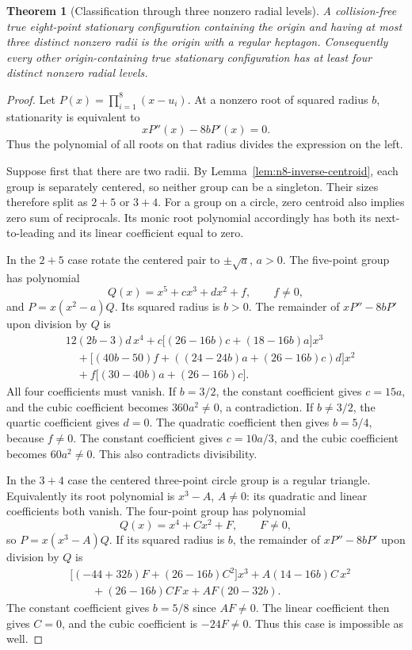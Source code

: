 \documentclass[11pt]{article}
\newtheorem{theorem}{Theorem}[section]
\theoremstyle{remark}
\numberwithin{equation}{section}
\begin{document}
\begin{theorem}[Classification through three nonzero radial levels]
\label{thm:n8-two-level-exclusion}
A collision-free true eight-point stationary configuration containing
the origin and having at most three distinct nonzero radii is the
origin with a regular heptagon. Consequently every other
origin-containing true stationary configuration has at least four
distinct nonzero radial levels.
\end{theorem}
\begin{proof}
Let $P(x)=\prod_{i=1}^8(x-u_i)$. At a nonzero root of squared radius
$b$, stationarity is equivalent to
\begin{equation}\label{eq:n8-radius-divisibility}
                   xP''(x)-8bP'(x)=0.
\end{equation}
Thus the polynomial of all roots on that radius divides the expression
on the left.

Suppose first that there are two radii. By
Lemma~\ref{lem:n8-inverse-centroid}, each group is separately centered,
so neither group can be a singleton. Their sizes therefore split as
$2+5$ or $3+4$. For a group on a circle, zero centroid also implies
zero sum of reciprocals. Its monic root polynomial accordingly has
both its next-to-leading and its linear coefficient equal to zero.

In the $2+5$ case rotate the centered pair to $\pm\sqrt a$, $a>0$.
The five-point group has polynomial
\[
 Q(x)=x^5+cx^3+dx^2+f,\qquad f\ne0,
\]
and $P=x(x^2-a)Q$. Its squared radius is $b>0$.
The remainder of $xP''-8bP'$ upon division by $Q$ is
\begin{align*}
 &12(2b-3)d\,x^4
 +c\bigl[(26-16b)c+(18-16b)a\bigr]x^3\\
 &\quad+\bigl[(40b-50)f+((24-24b)a+(26-16b)c)d\bigr]x^2\\
 &\quad+f\bigl[(30-40b)a+(26-16b)c\bigr].
\end{align*}
All four coefficients must vanish. If $b=3/2$, the constant
coefficient gives $c=15a$, and the cubic coefficient becomes
$360a^2\ne0$, a contradiction. If $b\ne3/2$, the quartic coefficient
gives $d=0$. The quadratic coefficient then gives $b=5/4$, because
$f\ne0$. The constant coefficient gives $c=10a/3$, and the cubic
coefficient becomes $60a^2\ne0$. This also contradicts divisibility.

In the $3+4$ case the centered three-point circle group is a regular
triangle. Equivalently its root polynomial is $x^3-A$, $A\ne0$:
its quadratic and linear coefficients both vanish. The four-point
group has polynomial
\[
 Q(x)=x^4+Cx^2+F,\qquad F\ne0,
\]
so $P=x(x^3-A)Q$. If its squared radius is $b$, the remainder of
$xP''-8bP'$ upon division by $Q$ is
\begin{align*}
 &\bigl[(-44+32b)F+(26-16b)C^2\bigr]x^3
 +A(14-16b)C\,x^2\\
 &\qquad +(26-16b)CF\,x+AF(20-32b).
\end{align*}
The constant coefficient gives $b=5/8$ since $AF\ne0$.
The linear coefficient then gives $C=0$, and the cubic coefficient
is $-24F\ne0$. Thus this case is impossible as well.


\end{proof}
\end{document}
